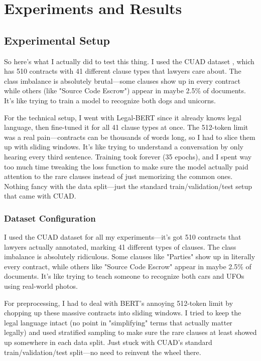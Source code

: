 \section{Experiments and Results}
\label{sec:experiments}

\subsection{Experimental Setup}

So here's what I actually did to test this thing. I used the CUAD dataset \cite{hendrycks2021cuad}, which has 510 contracts with 41 different clause types that lawyers care about. The class imbalance is absolutely brutal—some clauses show up in every contract while others (like "Source Code Escrow") appear in maybe 2.5\% of documents. It's like trying to train a model to recognize both dogs and unicorns.

For the technical setup, I went with Legal-BERT since it already knows legal language, then fine-tuned it for all 41 clause types at once. The 512-token limit was a real pain—contracts can be thousands of words long, so I had to slice them up with sliding windows. It's like trying to understand a conversation by only hearing every third sentence. Training took forever (35 epochs), and I spent way too much time tweaking the loss function to make sure the model actually paid attention to the rare clauses instead of just memorizing the common ones. Nothing fancy with the data split—just the standard train/validation/test setup that came with CUAD.

\subsubsection{Dataset Configuration}

I used the CUAD dataset \cite{hendrycks2021cuad} for all my experiments—it's got 510 contracts that lawyers actually annotated, marking 41 different types of clauses. The class imbalance is absolutely ridiculous. Some clauses like "Parties" show up in literally every contract, while others like "Source Code Escrow" appear in maybe 2.5\% of documents. It's like trying to teach someone to recognize both cars and UFOs using real-world photos.

For preprocessing, I had to deal with BERT's annoying 512-token limit by chopping up these massive contracts into sliding windows. I tried to keep the legal language intact (no point in "simplifying" terms that actually matter legally) and used stratified sampling to make sure the rare clauses at least showed up somewhere in each data split. Just stuck with CUAD's standard train/validation/test split—no need to reinvent the wheel there.

